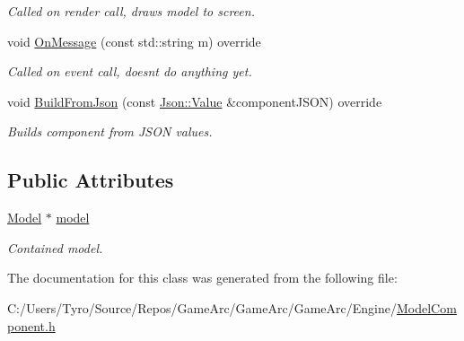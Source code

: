 \begin{DoxyCompactItemize}
\begin{DoxyCompactList}\small\item\em Called on render call, draws model to screen. \end{DoxyCompactList}\item 
\mbox{\label{class_model_component_a48d6170e857f323839039ce54e9418e1}} 
void \mbox{\hyperlink{class_model_component_a48d6170e857f323839039ce54e9418e1}{On\+Message}} (const std\+::string m) override
\begin{DoxyCompactList}\small\item\em Called on event call, doesn\textquotesingle{}t do anything yet. \end{DoxyCompactList}\item 
\mbox{\label{class_model_component_ac77290f521c0bf24d370f88327b407d5}} 
void \mbox{\hyperlink{class_model_component_ac77290f521c0bf24d370f88327b407d5}{Build\+From\+Json}} (const \mbox{\hyperlink{class_json_1_1_value}{Json\+::\+Value}} \&component\+J\+S\+ON) override
\begin{DoxyCompactList}\small\item\em Builds component from J\+S\+ON values. \end{DoxyCompactList}\end{DoxyCompactItemize}
\subsection*{Public Attributes}
\begin{DoxyCompactItemize}
\item 
\mbox{\label{class_model_component_a3dd9367267556f8aeb6abca61ee9dc6b}} 
\mbox{\hyperlink{class_model}{Model}} $\ast$ \mbox{\hyperlink{class_model_component_a3dd9367267556f8aeb6abca61ee9dc6b}{model}}
\begin{DoxyCompactList}\small\item\em Contained model. \end{DoxyCompactList}\end{DoxyCompactItemize}


The documentation for this class was generated from the following file\+:\begin{DoxyCompactItemize}
\item 
C\+:/\+Users/\+Tyro/\+Source/\+Repos/\+Game\+Arc/\+Game\+Arc/\+Game\+Arc/\+Engine/\mbox{\hyperlink{_model_component_8h}{Model\+Component.\+h}}\end{DoxyCompactItemize}

